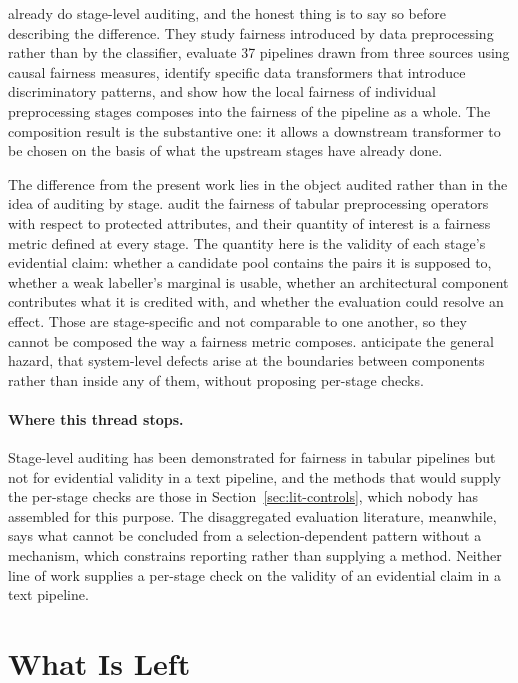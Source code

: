 \citet{biswas2021fairpreprocessing} already do stage-level auditing, and the honest thing is
to say so before describing the difference. They study fairness introduced by data
preprocessing rather than by the classifier, evaluate 37 pipelines drawn from three sources
using causal fairness measures, identify specific data transformers that introduce
discriminatory patterns, and show how the local fairness of individual preprocessing stages
composes into the fairness of the pipeline as a whole. The composition result is the
substantive one: it allows a downstream transformer to be chosen on the basis of what the
upstream stages have already done.

The difference from the present work lies in the object audited rather than in the idea of
auditing by stage. \citet{biswas2021fairpreprocessing} audit the fairness of tabular
preprocessing operators with respect to protected attributes, and their quantity of interest
is a fairness metric defined at every stage. The quantity here is the validity of each
stage's evidential claim: whether a candidate pool contains the pairs it is supposed to,
whether a weak labeller's marginal is usable, whether an architectural component contributes
what it is credited with, and whether the evaluation could resolve an effect. Those are
stage-specific and not comparable to one another, so they cannot be composed the way a
fairness metric composes. \citet{sculley2015debt} anticipate the general hazard, that
system-level defects arise at the boundaries between components rather than inside any of
them, without proposing per-stage checks.

\paragraph{Where this thread stops.} Stage-level auditing has been demonstrated for fairness
in tabular pipelines but not for evidential validity in a text pipeline, and the methods that
would supply the per-stage checks are those in Section~\ref{sec:lit-controls}, which nobody
has assembled for this purpose. The disaggregated evaluation literature, meanwhile, says what
cannot be concluded from a selection-dependent pattern without a mechanism, which constrains
reporting rather than supplying a method. Neither line of work supplies a per-stage check on
the validity of an evidential claim in a text pipeline.

\section{What Is Left}
\label{sec:lit-gap}

